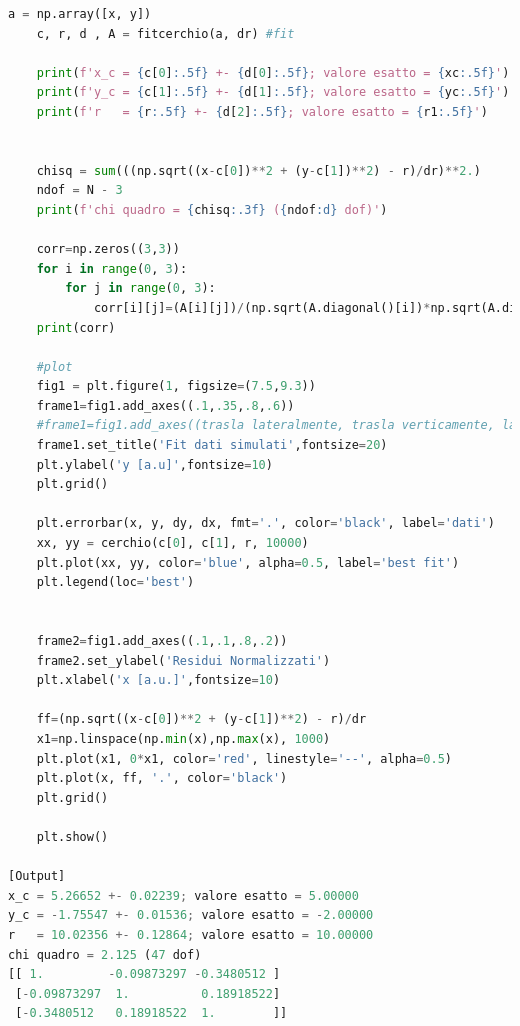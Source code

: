 \documentclass[10pt,a4paper]{article}
\begin{document}
\begin{lstlisting}[language=Python]
    a = np.array([x, y])
    c, r, d , A = fitcerchio(a, dr) #fit

    print(f'x_c = {c[0]:.5f} +- {d[0]:.5f}; valore esatto = {xc:.5f}')
    print(f'y_c = {c[1]:.5f} +- {d[1]:.5f}; valore esatto = {yc:.5f}')
    print(f'r   = {r:.5f} +- {d[2]:.5f}; valore esatto = {r1:.5f}')


    chisq = sum(((np.sqrt((x-c[0])**2 + (y-c[1])**2) - r)/dr)**2.)
    ndof = N - 3
    print(f'chi quadro = {chisq:.3f} ({ndof:d} dof)')

    corr=np.zeros((3,3))
    for i in range(0, 3):
        for j in range(0, 3):
            corr[i][j]=(A[i][j])/(np.sqrt(A.diagonal()[i])*np.sqrt(A.diagonal()[j]))
    print(corr)

    #plot
    fig1 = plt.figure(1, figsize=(7.5,9.3))
    frame1=fig1.add_axes((.1,.35,.8,.6))
    #frame1=fig1.add_axes((trasla lateralmente, trasla verticamente, larghezza, altezza))
    frame1.set_title('Fit dati simulati',fontsize=20)
    plt.ylabel('y [a.u]',fontsize=10)
    plt.grid()

    plt.errorbar(x, y, dy, dx, fmt='.', color='black', label='dati')
    xx, yy = cerchio(c[0], c[1], r, 10000)
    plt.plot(xx, yy, color='blue', alpha=0.5, label='best fit')
    plt.legend(loc='best')


    frame2=fig1.add_axes((.1,.1,.8,.2))
    frame2.set_ylabel('Residui Normalizzati')
    plt.xlabel('x [a.u.]',fontsize=10)

    ff=(np.sqrt((x-c[0])**2 + (y-c[1])**2) - r)/dr
    x1=np.linspace(np.min(x),np.max(x), 1000)
    plt.plot(x1, 0*x1, color='red', linestyle='--', alpha=0.5)
    plt.plot(x, ff, '.', color='black')
    plt.grid()

    plt.show()

[Output]
x_c = 5.26652 +- 0.02239; valore esatto = 5.00000
y_c = -1.75547 +- 0.01536; valore esatto = -2.00000
r   = 10.02356 +- 0.12864; valore esatto = 10.00000
chi quadro = 2.125 (47 dof)
[[ 1.         -0.09873297 -0.3480512 ]
 [-0.09873297  1.          0.18918522]
 [-0.3480512   0.18918522  1.        ]]
\end{lstlisting}
\end{document}
